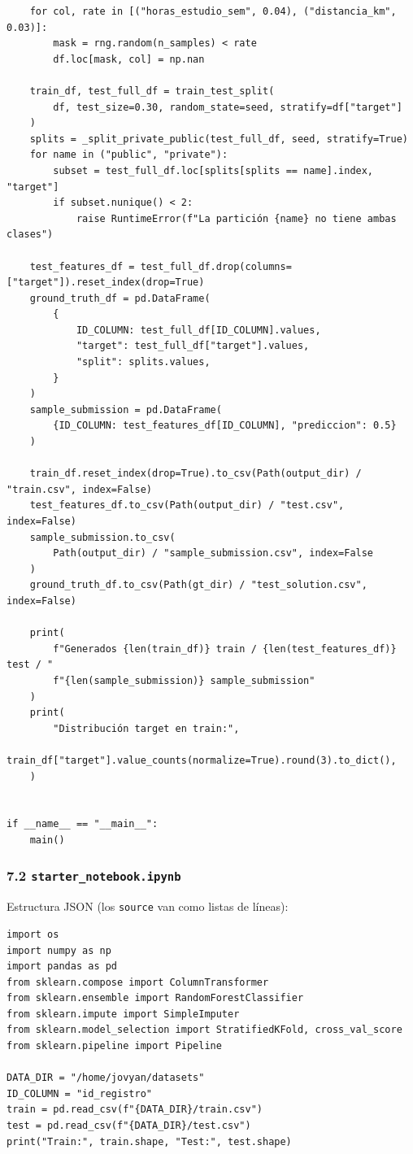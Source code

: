 \documentclass[11pt,a4paper]{article}
\begin{document}
\begin{lstlisting}
    for col, rate in [("horas_estudio_sem", 0.04), ("distancia_km", 0.03)]:
        mask = rng.random(n_samples) < rate
        df.loc[mask, col] = np.nan

    train_df, test_full_df = train_test_split(
        df, test_size=0.30, random_state=seed, stratify=df["target"]
    )
    splits = _split_private_public(test_full_df, seed, stratify=True)
    for name in ("public", "private"):
        subset = test_full_df.loc[splits[splits == name].index, "target"]
        if subset.nunique() < 2:
            raise RuntimeError(f"La partición {name} no tiene ambas clases")

    test_features_df = test_full_df.drop(columns=["target"]).reset_index(drop=True)
    ground_truth_df = pd.DataFrame(
        {
            ID_COLUMN: test_full_df[ID_COLUMN].values,
            "target": test_full_df["target"].values,
            "split": splits.values,
        }
    )
    sample_submission = pd.DataFrame(
        {ID_COLUMN: test_features_df[ID_COLUMN], "prediccion": 0.5}
    )

    train_df.reset_index(drop=True).to_csv(Path(output_dir) / "train.csv", index=False)
    test_features_df.to_csv(Path(output_dir) / "test.csv", index=False)
    sample_submission.to_csv(
        Path(output_dir) / "sample_submission.csv", index=False
    )
    ground_truth_df.to_csv(Path(gt_dir) / "test_solution.csv", index=False)

    print(
        f"Generados {len(train_df)} train / {len(test_features_df)} test / "
        f"{len(sample_submission)} sample_submission"
    )
    print(
        "Distribución target en train:",
        train_df["target"].value_counts(normalize=True).round(3).to_dict(),
    )


if __name__ == "__main__":
    main()
\end{lstlisting}

\hypertarget{72-starter_notebookipynb}{%
\subsubsection{\texorpdfstring{7.2 \texttt{starter\_\allowbreak{}notebook.\allowbreak{}ipynb}}{7.2 starter\_notebook.ipynb}}\label{72-starter_notebookipynb}}

Estructura JSON (los \texttt{source} van como listas de líneas):

\begin{lstlisting}
import os
import numpy as np
import pandas as pd
from sklearn.compose import ColumnTransformer
from sklearn.ensemble import RandomForestClassifier
from sklearn.impute import SimpleImputer
from sklearn.model_selection import StratifiedKFold, cross_val_score
from sklearn.pipeline import Pipeline

DATA_DIR = "/home/jovyan/datasets"
ID_COLUMN = "id_registro"
train = pd.read_csv(f"{DATA_DIR}/train.csv")
test = pd.read_csv(f"{DATA_DIR}/test.csv")
print("Train:", train.shape, "Test:", test.shape)
\end{lstlisting}
\end{document}
